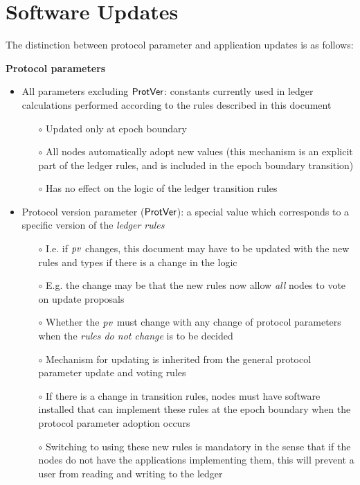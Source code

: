 \section{Software Updates}
\label{sec:software-updates}


The distinction between protocol parameter and application updates is as
follows: \newline

\noindent \textbf{Protocol parameters}
\begin{itemize}
  \item All parameters excluding $\mathsf{ProtVer}$: constants
currently used in ledger calculations performed according to the rules described
in this document
\begin{itemize}
\item[$\circ$] Updated only at epoch boundary
\item[$\circ$] All nodes automatically adopt new values (this mechanism is an explicit
 part of the ledger rules, and is included in the epoch boundary transition)
\item[$\circ$] Has no effect on the logic of the ledger transition rules
\end{itemize}
\item Protocol version parameter ($\mathsf{ProtVer}$): a special value which
corresponds to a specific version of the \textit{ledger rules}
\begin{itemize}
\item[$\circ$] I.e. if $\mathit{pv}$ changes, this document may have to be updated with
the new rules and types if there is a change in the logic
\item[$\circ$] E.g. the change may be that the new rules now allow \textit{all} nodes
to vote on update proposals
\item[$\circ$] Whether the $\mathit{pv}$ must change with any change of protocol
parameters when the \textit{rules do not change} is to be decided
\item[$\circ$] Mechanism for updating is inherited from the general protocol
parameter update and voting rules
\item[$\circ$] If there is a change in transition rules, nodes must have
software installed that can implement these rules at the epoch boundary
when the protocol parameter adoption occurs
\item[$\circ$] Switching to using these new rules is mandatory in the sense that
if the nodes do not have the applications implementing them, this
will prevent a user from reading and
writing to the ledger
\end{itemize}
\end{itemize}
